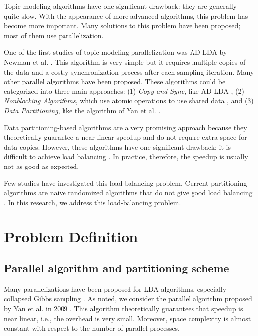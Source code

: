 \documentclass[10pt,conference]{IEEEtran}
\begin{document}
Topic modeling algorithms have one significant drawback: they are generally quite slow. With the appearance of more advanced algorithms, this problem has become more important. Many solutions to this problem have been proposed; most of them use parallelization. 

One of the first studies of topic modeling parallelization was AD-LDA by Newman et al. \cite{newman2007distributed}. This algorithm is very simple but it requires multiple copies of the data and a costly synchronization process after each sampling iteration. Many other parallel algorithms have been proposed. These algorithms could be categorized into three main approaches: (1) \textit{Copy and Sync}, like AD-LDA \cite{newman2007distributed,smyth2009asynchronous,masada2009accelerating}, (2) \textit{Nonblocking Algorithms}, which use atomic operations to use shared data \cite{smola2010architecture}, and (3) \textit{Data Partitioning}, like the algorithm of Yan et al. \cite{yan2009parallel}.

Data partitioning-based algorithms are a very promising approach because they theoretically guarantee a near-linear speedup and do not require extra space for data copies. However, these algorithms have one significant drawback: it is difficult to achieve load balancing \cite{yan2009parallel}. In practice, therefore, the speedup is usually not as good as expected. 

Few studies have investigated this load-balancing problem. Current partitioning algorithms are naive randomized algorithms that do not give good load balancing \cite{yan2009parallel}. In this research, we address this load-balancing problem.

\section{Problem Definition}
\subsection{Parallel algorithm and partitioning scheme}
Many parallelizations have been proposed for LDA algorithms, especially collapsed Gibbs sampling \cite{griffiths2004finding, newman2007distributed, newman2009distributed, smyth2009asynchronous, masada2009accelerating, smola2010architecture}. As noted, we consider the parallel algorithm proposed by Yan et al. in 2009 \cite{yan2009parallel}. This algorithm theoretically guarantees that speedup is near linear, i.e., the overhead is very small. Moreover, space complexity is almost constant with respect to the number of parallel processes.
\end{document}
